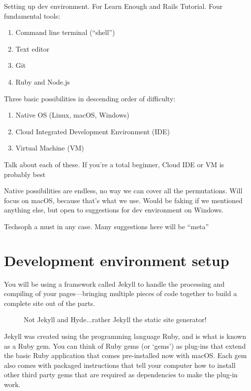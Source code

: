 Setting up dev environment. For Learn Enough and Rails Tutorial. Four fundamental tools:

\begin{enumerate}
  \item Command line terminal (``shell'')
  \item Text editor
  \item Git
  \item Ruby and Node.js
\end{enumerate}

Three basic possibilities in descending order of difficulty:

\begin{enumerate}
  \item Native OS (Linux, macOS, Windows)
  \item Cloud Integrated Development Environment (IDE)
  \item Virtual Machine (VM)
\end{enumerate}

Talk about each of these. If you're a total beginner, Cloud IDE or VM is probably best

Native possibilities are endless, no way we can cover all the permutations. Will focus on macOS, because that's what we use. Would be faking if we mentioned anything else, but open to suggestions for dev environment on Windows.

Techsoph a must in any case. Many suggestions here will be ``meta''


\section{Development environment setup}
\label{sec:jekyll-intro}

You will be using a framework called Jekyll to handle the processing and compiling of your pages---bringing multiple pieces of code together to build a complete site out of the parts.

\begin{figure}[H]
\begin{center}
\end{center}
\caption{Not Jekyll and Hyde...rather Jekyll the static site generator!\label{fig:jekyll}}

\end{figure}

Jekyll was created using the programming language Ruby, and is what is known as a Ruby gem. You can think of Ruby gems (or `gems') as plug-ins that extend the basic Ruby application that comes pre-installed now with macOS\@. Each gem also comes with packaged instructions that tell your computer how to install other third party gems that are required as dependencies to make the plug-in work.


